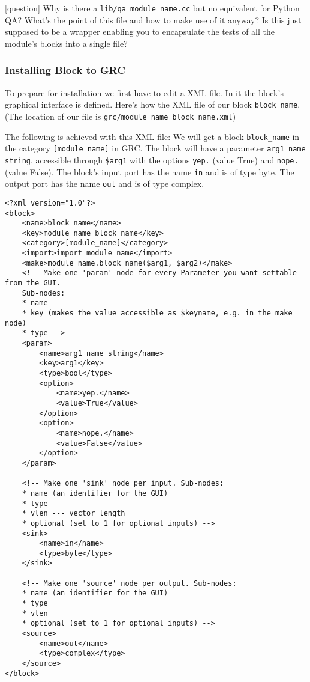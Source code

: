 \documentclass{article}
\begin{document}
\bigskip

\color{blue}
[question] Why is there a \verb|lib/qa_module_name.cc| but no equivalent for Python QA? What's the point of this file and how to make use of it anyway? Is this just supposed to be a wrapper enabling you to encapsulate the tests of all the module's blocks into a single file?
\color{black}

\subsubsection{Installing Block to GRC}

To prepare for installation we first have to  edit a XML file. In it the block's graphical interface is defined. Here's how the XML file of our block \verb|block_name|.
(The location of our file is \verb|grc/module_name_block_name.xml|)

\bigskip

The following is achieved with this XML file:
We will get a block \verb|block_name| in the category \verb|[module_name]| in GRC. The block will have a parameter \verb|arg1 name string|, accessible through \verb|$arg1| with the options \verb|yep.| (value True) and \verb|nope.| (value False). The block's input port has the name \verb|in| and is of type byte. The output port has the name \verb|out| and is of type complex.


\begin{verbatim}
<?xml version="1.0"?>
<block>
	<name>block_name</name>
	<key>module_name_block_name</key>
	<category>[module_name]</category>
	<import>import module_name</import>
	<make>module_name.block_name($arg1, $arg2)</make>
	<!-- Make one 'param' node for every Parameter you want settable from the GUI.
	Sub-nodes:
	* name
	* key (makes the value accessible as $keyname, e.g. in the make node)
	* type -->
	<param>
		<name>arg1 name string</name>
		<key>arg1</key>
		<type>bool</type>
		<option>
			<name>yep.</name>
			<value>True</value>
		</option>
		<option>
			<name>nope.</name>
			<value>False</value>
		</option>
	</param>
	
	<!-- Make one 'sink' node per input. Sub-nodes:
	* name (an identifier for the GUI)
	* type
	* vlen --- vector length
	* optional (set to 1 for optional inputs) -->
	<sink>
		<name>in</name>
		<type>byte</type>
	</sink>
	
	<!-- Make one 'source' node per output. Sub-nodes:
	* name (an identifier for the GUI)
	* type
	* vlen
	* optional (set to 1 for optional inputs) -->
	<source>
		<name>out</name>
		<type>complex</type>
	</source>
</block>
\end{verbatim}
\end{document}
